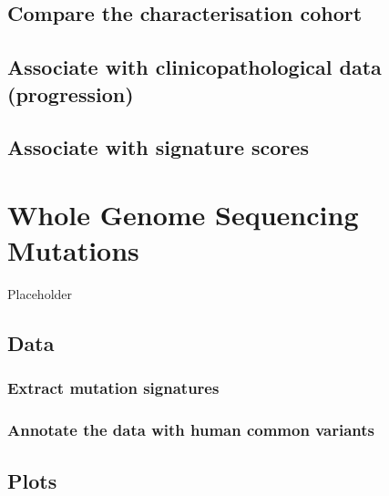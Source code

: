 \documentclass[
]{book}
\begin{document}
\hypertarget{compare-the-characterisation-cohort}{%
\section{Compare the characterisation cohort}\label{compare-the-characterisation-cohort}}

\hypertarget{associate-with-clinicopathological-data-progression}{%
\section{Associate with clinicopathological data (progression)}\label{associate-with-clinicopathological-data-progression}}

\hypertarget{associate-with-signature-scores}{%
\section{Associate with signature scores}\label{associate-with-signature-scores}}

\hypertarget{whole-genome-sequencing-mutations}{%
\chapter{Whole Genome Sequencing Mutations}\label{whole-genome-sequencing-mutations}}

Placeholder

\hypertarget{data}{%
\section{Data}\label{data}}

\hypertarget{extract-mutation-signatures}{%
\subsection{Extract mutation signatures}\label{extract-mutation-signatures}}

\hypertarget{annotate-the-data-with-human-common-variants}{%
\subsection{Annotate the data with human common variants}\label{annotate-the-data-with-human-common-variants}}

\hypertarget{plots}{%
\section{Plots}\label{plots}}
\end{document}
